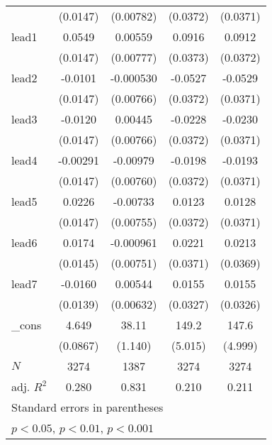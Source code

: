 {\begin{tabular}{l*{4}{c}}
            &    (0.0147)         &   (0.00782)         &    (0.0372)         &    (0.0371)         \\
[1em]
lead1       &      0.0549\sym{***}&     0.00559         &      0.0916\sym{*}  &      0.0912\sym{*}  \\
            &    (0.0147)         &   (0.00777)         &    (0.0373)         &    (0.0372)         \\
[1em]
lead2       &     -0.0101         &   -0.000530         &     -0.0527         &     -0.0529         \\
            &    (0.0147)         &   (0.00766)         &    (0.0372)         &    (0.0371)         \\
[1em]
lead3       &     -0.0120         &     0.00445         &     -0.0228         &     -0.0230         \\
            &    (0.0147)         &   (0.00766)         &    (0.0372)         &    (0.0371)         \\
[1em]
lead4       &    -0.00291         &    -0.00979         &     -0.0198         &     -0.0193         \\
            &    (0.0147)         &   (0.00760)         &    (0.0372)         &    (0.0371)         \\
[1em]
lead5       &      0.0226         &    -0.00733         &      0.0123         &      0.0128         \\
            &    (0.0147)         &   (0.00755)         &    (0.0372)         &    (0.0371)         \\
[1em]
lead6       &      0.0174         &   -0.000961         &      0.0221         &      0.0213         \\
            &    (0.0145)         &   (0.00751)         &    (0.0371)         &    (0.0369)         \\
[1em]
lead7       &     -0.0160         &     0.00544         &      0.0155         &      0.0155         \\
            &    (0.0139)         &   (0.00632)         &    (0.0327)         &    (0.0326)         \\
[1em]
\_cons      &       4.649\sym{***}&       38.11\sym{***}&       149.2\sym{***}&       147.6\sym{***}\\
            &    (0.0867)         &     (1.140)         &     (5.015)         &     (4.999)         \\
\hline
\(N\)       &        3274         &        1387         &        3274         &        3274         \\
adj. \(R^{2}\)&       0.280         &       0.831         &       0.210         &       0.211         \\
\hline\hline
\multicolumn{5}{l}{\footnotesize Standard errors in parentheses}\\
\multicolumn{5}{l}{\footnotesize \sym{*} \(p<0.05\), \sym{**} \(p<0.01\), \sym{***} \(p<0.001\)}\\
\end{tabular}
}
